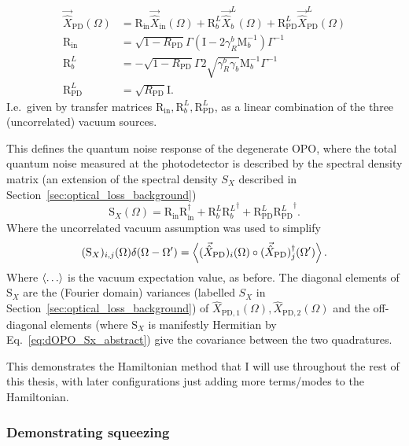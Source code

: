 \begin{align}
\label{eq:dOPO_PD_as_fn_of_vac}
\vec{\hat X}_\mathrm{PD}(\Omega)&=\text{R}_\text{in}\vec{\hat X}_\mathrm{in}(\Omega)+\text{R}^L_b\vec{\hat X}^L_b(\Omega)+\text{R}^L_\text{PD}\vec{\hat X}^L_\text{PD}(\Omega)\\
\text{R}_\text{in}&=\sqrt{1-R_\text{PD}}\Gamma\left(\text{I}-2\gamma^b_R\text{M}_b^{-1}\right)\Gamma^{-1}\\
\text{R}^L_b&=-\sqrt{1-R_\text{PD}}\Gamma 2\sqrt{\gamma^b_R \gamma_b}\text{M}_b^{-1}\Gamma^{-1}\\
\text{R}^L_\text{PD}&=\sqrt{R_\text{PD}} \text{I}.
\end{align}
I.e.\ given by transfer matrices $\text{R}_\text{in},\text{R}^L_b, \text{R}^L_\text{PD}$, as a linear combination of the three (uncorrelated) vacuum sources.

This defines the quantum noise response of the degenerate OPO, where the total quantum noise measured at the photodetector is described by the spectral density matrix (an extension of the spectral density $S_X$ described in Section~\ref{sec:optical_loss_background}) \begin{equation}\label{eq:dOPO_Sx_abstract}\text{S}_X(\Omega)=\text{R}_\text{in} \text{R}_\text{in}^\dag+\text{R}^L_b {\text{R}^L_b}^\dag+\text{R}^L_\text{PD}{\text{R}^L_\text{PD}}^\dag.\end{equation} Where the uncorrelated vacuum assumption was used to simplify 
\begin{equation}\label{eq:total_noise_matrix}
(\text{S}_X)_{i,j}(\Omega)\delta(\Omega-\Omega')=\ev{(\vec{\hat X}_\text{PD})_i(\Omega)\circ(\vec{\hat X}_\text{PD})_j^\dag(\Omega')}.
\end{equation}
Where $\ev{\ldots}$ is the vacuum expectation value, as before. The diagonal elements of $\text{S}_X$ are the (Fourier domain) variances (labelled $S_X$ in Section~\ref{sec:optical_loss_background}) of ${\hat X}_{\mathrm{PD},1}(\Omega), {\hat X}_{\mathrm{PD},2}(\Omega)$ and the off-diagonal elements (where $\text{S}_X$ is manifestly Hermitian by Eq.~\ref{eq:dOPO_Sx_abstract}) give the covariance between the two quadratures.

This demonstrates the Hamiltonian method that I will use throughout the rest of this thesis, with later configurations just adding more terms/modes to the Hamiltonian. %

\subsubsection{Demonstrating squeezing}

